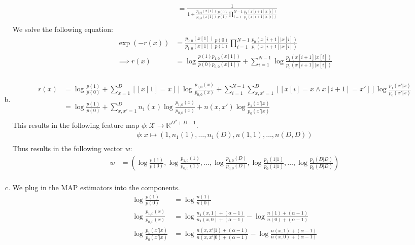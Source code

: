 \documentclass{amsart}
\newcommand{\rr}{\mathbb{R}}    %
\theoremstyle{definition}
\begin{document}
\begin{enumerate}[(a)]
\begin{align*}
			&= \frac{1}{1 + \frac{p_{0,0}(x[1])}{p_{1,0}(x[1])}\frac{p(0)}{p(1)}\prod_{i=1}^{N-1}\frac{p_0(x[i + 1]|x[i])}{p_1(x[i + 1]|x[i])}}\\
		\end{align*}
		We solve the following equation:
		\begin{align*}
			\exp(-r(x)) &= \frac{p_{0,0}(x[1])}{p_{1,0}(x[1])}\frac{p(0)}{p(1)}\prod_{i=1}^{N-1}\frac{p_0(x[i + 1]|x[i])}{p_1(x[i + 1]|x[i])}\\
			\implies r(x) &= \log \frac{p(1)p_{1,0}(x[1])}{p(0)p_{0,0}(x[1])} + \sum_{i=1}^{N-1}\log\frac{p_1(x[i + 1]|x[i])}{p_0(x[i + 1]|x[i])}\\
		\end{align*}
	\item
		\begin{align*}
			r(x) &= \log \frac{p(1)}{p(0)} + \sum_{x = 1}^{D}[[x[1] = x]]\log \frac{p_{1, 0}(x)}{p_{0, 0}(x)} + \sum_{i=1}^{N-1}\sum_{x, x' = 1}^{D}[[x[i] = x \land x[i + 1] = x']]\log\frac{p_1(x'|x)}{p_0(x'|x)}\\
			&= \log \frac{p(1)}{p(0)} + \sum_{x, x' = 1}^{D} n_1(x)\log \frac{p_{1, 0}(x)}{p_{0, 0}(x)} +  n(x, x')\log\frac{p_1(x'|x)}{p_0(x'|x)}\\
		\end{align*}
		This results in the following feature map $\phi : \mathcal{X} \to \rr^{D^2 + D + 1}$.
		\begin{align*}
			\phi: x \mapsto (1, n_1(1), \ldots, n_1(D), n(1, 1), \ldots, n(D, D))\\	
		\end{align*}
		Thus results in the following vector $w$:
		\begin{align*}
			w &= \left(\log \frac{p(1)}{p(0)}, \log \frac{p_{1,0}(1)}{p_{0,0}(1)}, \ldots, \log \frac{p_{1,0}(D)}{p_{0,0}(D)}, \log \frac{p_1(1|1)}{p_0(1|1)}, \ldots, \log \frac{p_1(D|D)}{p_0(D|D)}\right)\\
		\end{align*}
	\item 
		We plug in the MAP estimators into the components.
		\begin{align*}
			\log \frac{p(1)}{p(0)} &= \log \frac{n(1)}{n(0)}\\
			\log \frac{p_{1,0}(x)}{p_{0,0}(x)} &= \log \frac{n_1(x, 1) + (\alpha - 1)}{n_1(x, 0) + (\alpha - 1)} - \log \frac{n(1) + (\alpha - 1)}{n(0) + (\alpha - 1)}\\
			\log \frac{p_1(x'|x)}{p_0(x'|x)} &= \log \frac{n(x, x'| 1) + (\alpha - 1)}{n(x, x'|0) + (\alpha - 1)} - \log \frac{n(x, 1) + (\alpha - 1)}{n(x, 0) + (\alpha - 1)}\\

\end{align*}
\end{enumerate}
\end{document}
